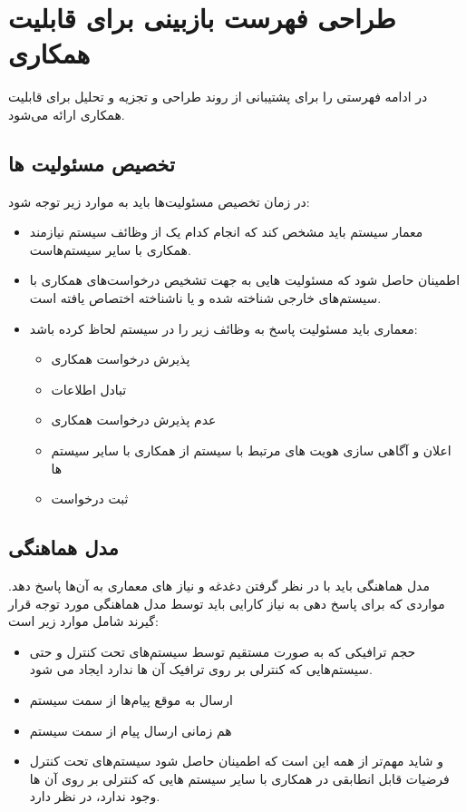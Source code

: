 \section{طراحی فهرست بازبینی برای قابلیت همکاری}

در ادامه فهرستی را برای پشتیبانی از روند طراحی و تجزیه و تحلیل برای قابلیت همکاری ارائه می‌شود.


\subsection{تخصیص مسئولیت ها} 
در زمان تخصیص مسئولیت‌ها باید  به موارد زیر توجه شود:
\begin{itemize}
\item
معمار سیستم باید مشخص کند که انجام کدام یک از وظائف سیستم نیازمند همکاری با سایر سیستم‌هاست.
\item
اطمینان حاصل شود که مسئولیت هایی به جهت تشخیص درخواست‌های همکاری با سیستم‌های خارجی شناخته شده و یا ناشناخته اختصاص یافته است.
\item
معماری باید مسئولیت پاسخ به وظائف زیر را در سیستم لحاظ کرده باشد:
\begin{itemize}
\item
پذیرش درخواست همکاری
\item
تبادل اطلاعات
\item
عدم پذیرش درخواست همکاری
\item
اعلان و آگاهی سازی هویت های مرتبط با سیستم از همکاری با سایر سیستم ها
\item
ثبت درخواست
\end{itemize}
\end{itemize}

\subsection{مدل هماهنگی}
مدل هماهنگی باید با در نظر گرفتن دغدغه و نیاز های معماری به آن‌ها پاسخ دهد. مواردی که برای پاسخ دهی به نیاز کارایی باید توسط مدل هماهنگی مورد توجه قرار گیرند شامل موارد زیر است:
\begin{itemize}
\item
حجم ترافیکی که به صورت مستقیم توسط سیستم‌های تحت کنترل و حتی سیستم‌هایی که کنترلی بر روی ترافیک آن ها ندارد ایجاد می شود.
\item
ارسال به موقع پیام‌ها از سمت سیستم
\item
هم زمانی ارسال پیام از سمت سیستم
\item
و شاید مهم‌تر از همه این است که اطمینان حاصل شود سیستم‌های تحت کنترل فرضیات قابل انطابقی در همکاری با سایر سیستم هایی که کنترلی بر روی آن ها وجود ندارد، در نظر دارد.
\end{itemize}

